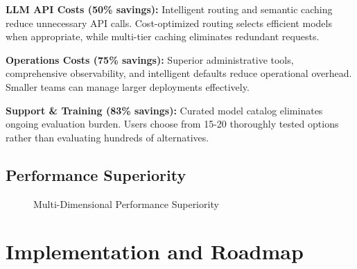 \documentclass[12pt,a4paper,twoside]{report}
\begin{document}
\textbf{LLM API Costs (50\% savings):} Intelligent routing and semantic caching reduce unnecessary API calls. Cost-optimized routing selects efficient models when appropriate, while multi-tier caching eliminates redundant requests.

\textbf{Operations Costs (75\% savings):} Superior administrative tools, comprehensive observability, and intelligent defaults reduce operational overhead. Smaller teams can manage larger deployments effectively.

\textbf{Support \& Training (83\% savings):} Curated model catalog eliminates ongoing evaluation burden. Users choose from 15-20 thoroughly tested options rather than evaluating hundreds of alternatives.

\section{Performance Superiority}

\begin{figure}[h]
\centering
{}
\caption{Multi-Dimensional Performance Superiority}
\label{fig:performance-superiority}
\end{figure}


\chapter{Implementation and Roadmap}
\end{document}
